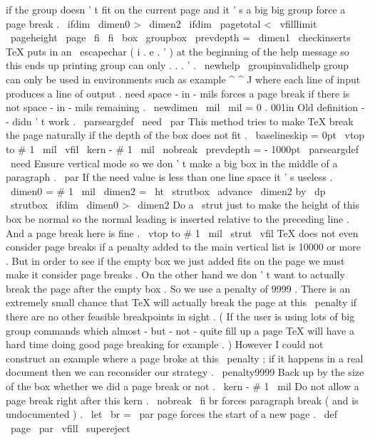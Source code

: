 {{if
the
group
doesn
'
t
fit
on
the
current
page
and
it
'
s
a
big
big
%
group
force
a
page
break
.
\
ifdim
\
dimen0
>
\
dimen2
\
ifdim
\
pagetotal
<
\
vfilllimit
\
pageheight
\
page
\
fi
\
fi
\
box
\
groupbox
\
prevdepth
=
\
dimen1
\
checkinserts
}
%
%
TeX
puts
in
an
\
escapechar
(
i
.
e
.
'
)
at
the
beginning
of
the
help
%
message
so
this
ends
up
printing
group
can
only
.
.
.
'
.
%
\
newhelp
\
groupinvalidhelp
{
%
group
can
only
be
used
in
environments
such
as
example
^
^
J
%
where
each
line
of
input
produces
a
line
of
output
.
}
%
need
space
-
in
-
mils
%
forces
a
page
break
if
there
is
not
space
-
in
-
mils
remaining
.
\
newdimen
\
mil
\
mil
=
0
.
001in
%
Old
definition
-
-
didn
'
t
work
.
%
\
parseargdef
\
need
{
\
par
%
%
%
This
method
tries
to
make
TeX
break
the
page
naturally
%
%
if
the
depth
of
the
box
does
not
fit
.
%
{
\
baselineskip
=
0pt
%
%
\
vtop
to
#
1
\
mil
{
\
vfil
}
\
kern
-
#
1
\
mil
\
nobreak
%
\
prevdepth
=
-
1000pt
%
}
}
\
parseargdef
\
need
{
%
%
Ensure
vertical
mode
so
we
don
'
t
make
a
big
box
in
the
middle
of
a
%
paragraph
.
\
par
%
%
If
the
need
value
is
less
than
one
line
space
it
'
s
useless
.
\
dimen0
=
#
1
\
mil
\
dimen2
=
\
ht
\
strutbox
\
advance
\
dimen2
by
\
dp
\
strutbox
\
ifdim
\
dimen0
>
\
dimen2
%
%
Do
a
\
strut
just
to
make
the
height
of
this
box
be
normal
so
the
%
normal
leading
is
inserted
relative
to
the
preceding
line
.
%
And
a
page
break
here
is
fine
.
\
vtop
to
#
1
\
mil
{
\
strut
\
vfil
}
%
%
%
TeX
does
not
even
consider
page
breaks
if
a
penalty
added
to
the
%
main
vertical
list
is
10000
or
more
.
But
in
order
to
see
if
the
%
empty
box
we
just
added
fits
on
the
page
we
must
make
it
consider
%
page
breaks
.
On
the
other
hand
we
don
'
t
want
to
actually
break
the
%
page
after
the
empty
box
.
So
we
use
a
penalty
of
9999
.
%
%
There
is
an
extremely
small
chance
that
TeX
will
actually
break
the
%
page
at
this
\
penalty
if
there
are
no
other
feasible
breakpoints
in
%
sight
.
(
If
the
user
is
using
lots
of
big
group
commands
which
%
almost
-
but
-
not
-
quite
fill
up
a
page
TeX
will
have
a
hard
time
doing
%
good
page
breaking
for
example
.
)
However
I
could
not
construct
an
%
example
where
a
page
broke
at
this
\
penalty
;
if
it
happens
in
a
real
%
document
then
we
can
reconsider
our
strategy
.
\
penalty9999
%
%
Back
up
by
the
size
of
the
box
whether
we
did
a
page
break
or
not
.
\
kern
-
#
1
\
mil
%
%
Do
not
allow
a
page
break
right
after
this
kern
.
\
nobreak
\
fi
}
%
br
forces
paragraph
break
(
and
is
undocumented
)
.
\
let
\
br
=
\
par
%
page
forces
the
start
of
a
new
page
.
%
\
def
\
page
{
\
par
\
vfill
\
supereject
}}
